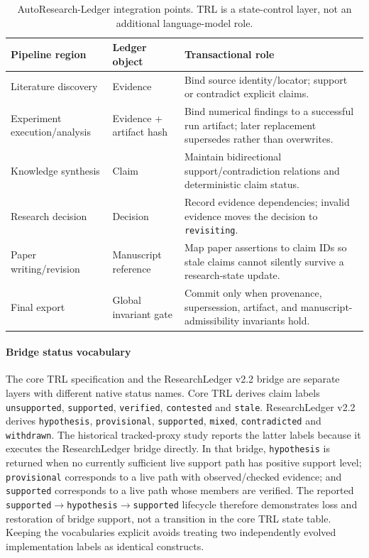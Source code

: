 \documentclass[journal]{IEEEtran}
\begin{document}
\begin{table}[!t]
\centering
\caption{AutoResearch-Ledger integration points. TRL is a state-control layer, not an additional language-model role.}
\label{tab:integration}
\begin{tabular}{p{}p{}p{}}
\toprule
Pipeline region & Ledger object & Transactional role \\
\midrule
Literature discovery & Evidence & Bind source identity/locator; support or contradict explicit claims. \\
Experiment execution/analysis & Evidence + artifact hash & Bind numerical findings to a successful run artifact; later replacement supersedes rather than overwrites. \\
Knowledge synthesis & Claim & Maintain bidirectional support/contradiction relations and deterministic claim status. \\
Research decision & Decision & Record evidence dependencies; invalid evidence moves the decision to \texttt{revisiting}. \\
Paper writing/revision & Manuscript reference & Map paper assertions to claim IDs so stale claims cannot silently survive a research-state update. \\
Final export & Global invariant gate & Commit only when provenance, supersession, artifact, and manuscript-admissibility invariants hold. \\
\bottomrule
\end{tabular}
\end{table}

\paragraph{Bridge status vocabulary}
The core TRL specification and the ResearchLedger v2.2 bridge are separate layers with different native status names. Core TRL derives claim labels \texttt{unsupported}, \texttt{supported}, \texttt{verified}, \texttt{contested} and \texttt{stale}. ResearchLedger v2.2 derives \texttt{hypothesis}, \texttt{provisional}, \texttt{supported}, \texttt{mixed}, \texttt{contradicted} and \texttt{withdrawn}. The historical tracked-proxy study reports the latter labels because it executes the ResearchLedger bridge directly. In that bridge, \texttt{hypothesis} is returned when no currently sufficient live support path has positive support level; \texttt{provisional} corresponds to a live path with observed/checked evidence; and \texttt{supported} corresponds to a live path whose members are verified. The reported \texttt{supported}$\to$\texttt{hypothesis}$\to$\texttt{supported} lifecycle therefore demonstrates loss and restoration of bridge support, not a transition in the core TRL state table. Keeping the vocabularies explicit avoids treating two independently evolved implementation labels as identical constructs.
\end{document}
